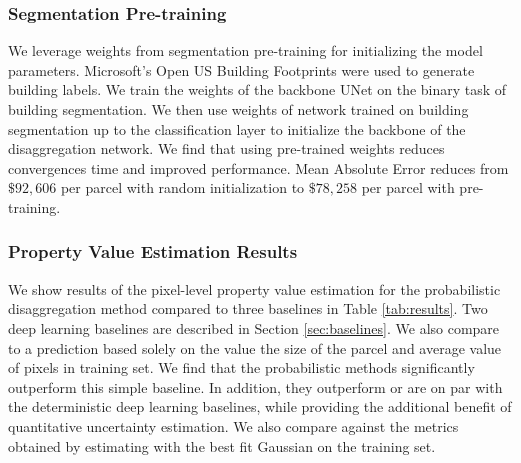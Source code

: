 \documentclass[10pt,twocolumn,letterpaper]{article}
\begin{document}
\subsubsection{Segmentation Pre-training}
We leverage weights from segmentation pre-training for initializing the model parameters. Microsoft's Open US Building Footprints were used to generate building labels. We train the weights of the backbone UNet on the binary task of building segmentation. We then use weights of network trained on building segmentation up to the classification layer to initialize the backbone of the disaggregation network. We find that using pre-trained weights reduces convergences time and improved performance. Mean Absolute Error reduces from $\$ 92,606$ per parcel with random initialization to $\$78,258$ per parcel with pre-training.



\subsubsection{Property Value Estimation Results}
We show results of the pixel-level property value estimation for the probabilistic disaggregation method compared to three baselines in Table \ref{tab:results}. Two deep learning baselines are described in Section \ref{sec:baselines}. We also compare to a prediction based solely on the value the size of the parcel and average value of pixels in training set. We find that the probabilistic methods significantly outperform this simple baseline. In addition, they outperform or are on par with the deterministic deep learning baselines, while providing the additional benefit of quantitative uncertainty estimation. We also compare against the metrics obtained by estimating with the best fit Gaussian on the training set.
\end{document}
